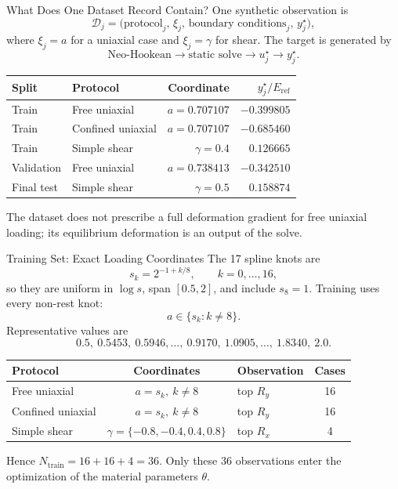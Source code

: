 \documentclass[aspectratio=169,10pt]{beamer}
\newcommand{\eref}{E_{\mathrm{ref}}}
\begin{document}
\begin{frame}{What Does One Dataset Record Contain?}
  \small
  One synthetic observation is
  \[
    \boxed{
      \mathcal D_j
      =
      \bigl(
        \text{protocol}_j,\,
        \xi_j,\,
        \text{boundary conditions}_j,\,
        y_j^\star
      \bigr)
    },
  \]
  where $\xi_j=a$ for a uniaxial case and $\xi_j=\gamma$ for shear.
  The target is generated by
  \[
    \text{Neo-Hookean}
    \longrightarrow
    \text{static solve}
    \longrightarrow
    u_j^\star
    \longrightarrow
    y_j^\star.
  \]

  \begin{table}
    \centering
    \begin{tabular}{llrr}
      \toprule
      Split & Protocol & Coordinate & $y_j^\star/\eref$ \\
      \midrule
      Train & Free uniaxial & $a=0.707107$ & $-0.399805$ \\
      Train & Confined uniaxial & $a=0.707107$ & $-0.685460$ \\
      Train & Simple shear & $\gamma=0.4$ & $0.126665$ \\
      Validation & Free uniaxial & $a=0.738413$ & $-0.342510$ \\
      Final test & Simple shear & $\gamma=0.5$ & $0.158874$ \\
      \bottomrule
    \end{tabular}
  \end{table}

  The dataset does not prescribe a full deformation gradient for free
  uniaxial loading; its equilibrium deformation is an output of the solve.
\end{frame}

\begin{frame}{Training Set: Exact Loading Coordinates}
  \small
  The 17 spline knots are
  \[
    s_k=2^{-1+k/8},
    \qquad k=0,\ldots,16,
  \]
  so they are uniform in $\log s$, span $[0.5,2]$, and include $s_8=1$.
  Training uses every non-rest knot:
  \[
    a\in\{s_k:k\neq8\}.
  \]
  Representative values are
  \[
    0.5,\ 0.5453,\ 0.5946,\ldots,\ 0.9170,\ 
    1.0905,\ldots,\ 1.8340,\ 2.0.
  \]

  \begin{table}
    \centering
    \begin{tabular}{lclc}
      \toprule
      Protocol & Coordinates & Observation & Cases \\
      \midrule
      Free uniaxial & $a=s_k,\ k\neq8$ & top $R_y$ & 16 \\
      Confined uniaxial & $a=s_k,\ k\neq8$ & top $R_y$ & 16 \\
      Simple shear & $\gamma=\{-0.8,-0.4,0.4,0.8\}$ &
      top $R_x$ & 4 \\
      \bottomrule
    \end{tabular}
  \end{table}

  Hence $N_{\mathrm{train}}=16+16+4=36$. Only these 36 observations enter
  the optimization of the material parameters $\theta$.
\end{frame}
\end{document}
